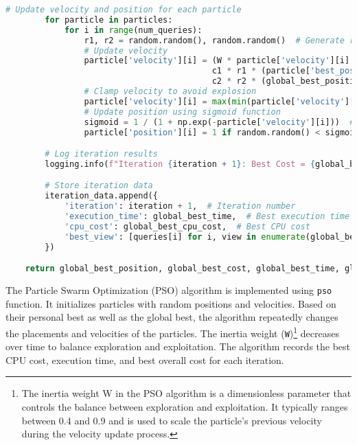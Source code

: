 \begin{lstlisting}[language=Python]
        # Update velocity and position for each particle
        for particle in particles:
            for i in range(num_queries):
                r1, r2 = random.random(), random.random()  # Generate random numbers
                # Update velocity
                particle['velocity'][i] = (W * particle['velocity'][i] +
                                          c1 * r1 * (particle['best_position'][i] - particle['position'][i]) +
                                          c2 * r2 * (global_best_position[i] - particle['position'][i]))
                # Clamp velocity to avoid explosion
                particle['velocity'][i] = max(min(particle['velocity'][i], v_max), -v_max)
                # Update position using sigmoid function
                sigmoid = 1 / (1 + np.exp(-particle['velocity'][i]))  # Sigmoid function
                particle['position'][i] = 1 if random.random() < sigmoid else 0  # Update position

        # Log iteration results
        logging.info(f"Iteration {iteration + 1}: Best Cost = {global_best_cost:.4f}, Execution Time = {global_best_time:.4f}, CPU Cost = {global_best_cpu_cost:.4f}")

        # Store iteration data
        iteration_data.append({
            'iteration': iteration + 1,  # Iteration number
            'execution_time': global_best_time,  # Best execution time
            'cpu_cost': global_best_cpu_cost,  # Best CPU cost
            'best_view': [queries[i] for i, view in enumerate(global_best_position) if view == 1]  # Best view(s)
        })

    return global_best_position, global_best_cost, global_best_time, global_best_cpu_cost, iteration_data
\end{lstlisting}\vspace{.4cm}

The Particle Swarm Optimization (PSO) algorithm is implemented using \texttt{pso} function. It initializes particles with random positions and velocities. Based on their personal best as well as the global best, the algorithm repeatedly changes the placements and velocities of the particles. The inertia weight (\texttt{W})\footnote{The inertia weight W in the PSO algorithm is a dimensionless parameter that controls the balance between exploration and exploitation. It typically ranges between 0.4 and 0.9 and is used to scale the particle's previous velocity during the velocity update process.} decreases over time to balance exploration and exploitation. The algorithm records the best CPU cost, execution time, and best overall cost for each iteration.

